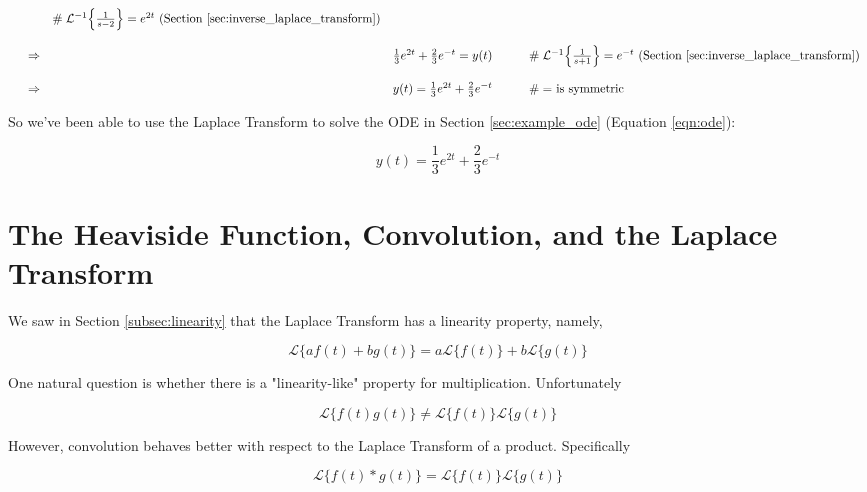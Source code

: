 \documentclass{article}
\theoremstyle{definition}
\begin{document}
\begin{equation*}
\begin{array}{lllll}
                                                                                                                   &\qquad \mathrel{\#} \text{$\mathcal{L}^{-1} \Big \{ \frac{1}{s-2} \Big \} = e^{2t}$ (Section \ref{sec:inverse_laplace_transform})}  \\
[15pt]
&\Rightarrow& \frac{1}{3} e^{2t} + \frac{2}{3} e^{-t} = y(t)                          &\qquad \mathrel{\#} \text{$\mathcal{L}^{-1} \Big \{ \frac{1}{s+1} \Big \} = e^{-t}$ (Section \ref{sec:inverse_laplace_transform})}  \\
[15pt]
&\Rightarrow& y(t) = \frac{1}{3} e^{2t} + \frac{2}{3} e^{-t}                          &\qquad \mathrel{\#} \text{$=$ is symmetric}
\end{array}
\end{equation*}


\bigskip
\noindent
So we've been able to use the Laplace Transform to solve the ODE in Section \ref{sec:example_ode} (Equation \ref{eqn:ode}):

\bigskip
\begin{equation*}
y(t) = \frac{1}{3} e^{2t} + \frac{2}{3} e^{-t}   
\end{equation*}

\section{\large The Heaviside Function, Convolution, and the Laplace Transform}
We saw in Section \ref{subsec:linearity} that the Laplace Transform has a linearity property, namely, 

\bigskip
\begin{equation*}
\mathcal{L}\{af (t) + bg(t)\} = a\mathcal{L}\{f(t)\} + b\mathcal{L}\{g(t)\}
\end{equation*}

\bigskip
\noindent
One natural question is whether there is a "linearity-like" property for multiplication. Unfortunately

\bigskip
\begin{equation*}
\mathcal{L}\{f(t)g(t)\} \neq  \mathcal{L}\{f(t)\}\mathcal{L}\{g(t)\}
\end{equation*}

\bigskip
\noindent
However, convolution behaves better with respect to the Laplace Transform of a product. Specifically

\bigskip
\begin{equation}
\mathcal{L}\{f(t) \ast g(t)\} =  \mathcal{L}\{f(t)\}\mathcal{L}\{g(t)\}
\label{eqn:lt_of_convolution}
\end{equation}
\end{document}
